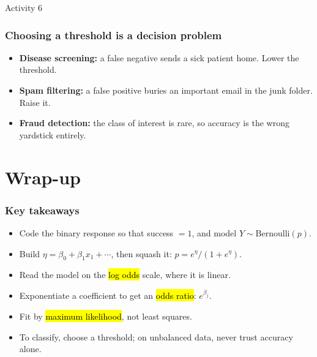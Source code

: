\documentclass[slidestop,compress,mathserif]{beamer}
\begin{document}
\begin{frame}{Activity 6}
\end{frame}
\begin{frame}
\frametitle{Choosing a threshold is a decision problem}

\begin{itemize}
\item \textbf{Disease screening:} a false negative sends a sick patient home. Lower the threshold.
\item \textbf{Spam filtering:} a false positive buries an important email in the junk folder. Raise it.
\item \textbf{Fraud detection:} the class of interest is rare, so accuracy is the wrong yardstick entirely.
\end{itemize}

\vspace{0.6em}

\end{frame}
\section{Wrap-up}
\begin{frame}
\frametitle{Key takeaways}

\begin{itemize}
\item Code the binary response so that success $=1$, and model $Y\sim\text{Bernoulli}(p)$.
\item Build $\eta=\beta_0+\beta_1x_1+\cdots$, then squash it: $p=e^{\eta}/(1+e^{\eta})$.
\item Read the model on the \hl{log odds} scale, where it is linear.
\item Exponentiate a coefficient to get an \hl{odds ratio}: $e^{\beta_j}$.
\item Fit by \hl{maximum likelihood}, not least squares.
\item To classify, choose a threshold; on unbalanced data, never trust accuracy alone.
\end{itemize}

\end{frame}

\end{document}
